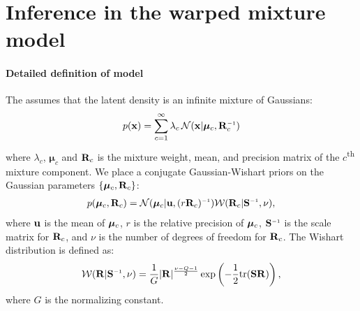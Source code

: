 









\chapter{Inference in the warped mixture model}
\label{ch:warped-appendix}

\subsubsection{Detailed definition of model}

The \iwmm{} assumes that the latent density is an infinite mixture of Gaussians:
\begin{align}
p(\vx ) = \sum_{c=1}^{\infty} \lambda_c \, {\cal N}(\vx|\bm{\mu}_{c},\vR_{c}\inv)
\end{align}
where $\lambda_{c}$, $\bm{\mu}_{c}$ and $\mathbf{R}_{c}$ is the mixture weight, mean, and precision matrix of the $c$\textsuperscript{th} mixture component.
%
We place a conjugate Gaussian-Wishart priors on the Gaussian parameters $\{\bm{\mu}_{c},\mathbf{R}_{c}\}$:
\begin{align}
p(\bm{\mu}_{c},\vR_{c})
= {\cal N}(\bm{\mu}_{c}|\vu,(r\vR_{c})\inv)
{\cal W}(\vR_{c}|\vS\inv,\nu),
\label{eq:normal-wishar-prior}
\end{align}
%
where ${\bf{u}}$ is the mean of ${\boldsymbol{\mu}}_c$, $r$ is the relative precision of ${\boldsymbol{\mu}}_c$, $\vS\inv$ is the scale matrix for $\mathbf{R}_c$, and $\nu$ is the number of degrees of freedom for $\mathbf{R}_c$.
The Wishart distribution is defined as:
%
\begin{align}
{\cal W}(\vR|\vS\inv,\nu)=\frac{1}{G}|\vR|^{\frac{\nu-Q-1}{2}}\exp\left(-\frac{1}{2}{\rm tr}(\vS\vR)\right),
\end{align}
%
where $G$ is the normalizing constant.

